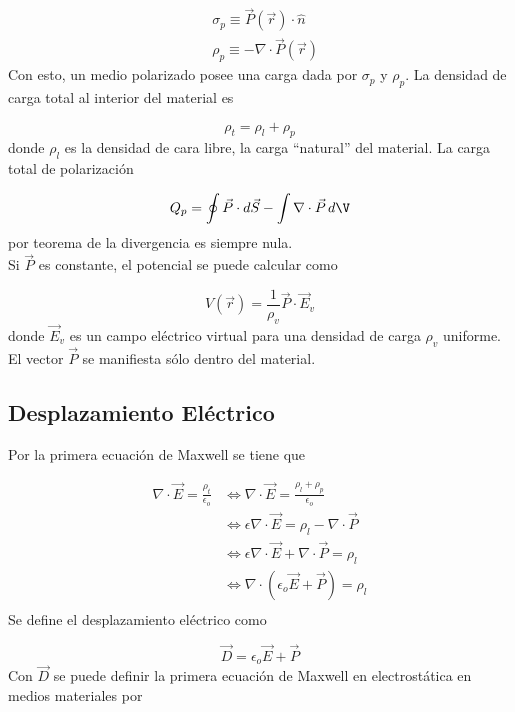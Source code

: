 \begin{equation}
\begin{split}
    &\sigma_p \equiv \Vec{P}(\Vec{r})\cdot\hat{n}\\
    &\rho_p \equiv -\nabla\cdot\Vec{P}(\Vec{r})
\end{split}
\nonumber
\end{equation}
\bigbreak
Con esto, un medio polarizado posee una carga dada por $\sigma_p$ y $\rho_p$. La densidad de carga total al interior del material es

\[\rho_t = \rho_l+\rho_p\]
\bigbreak
donde $\rho_l$ es la densidad de cara libre, la carga ``natural'' del material. La carga total de polarización

\[Q_p=\oint \Vec{P}\cdot d\Vec{S}-\int\nabla\cdot\Vec{P}\,d\V\]
\bigbreak
por teorema de la divergencia es siempre nula.\\

Si $\Vec{P}$ es constante, el potencial se puede calcular como

\[V(\Vec{r})=\frac{1}{\rho_v}\Vec{P}\cdot\Vec{E}_v\]
\bigbreak
donde $\Vec{E}_v$ es un campo eléctrico virtual para una densidad de carga $\rho_v$ uniforme. El vector $\Vec{P}$ se manifiesta sólo dentro del material.

\subsection{Desplazamiento Eléctrico}

Por la primera ecuación de Maxwell se tiene que

\begin{equation}
\begin{split}
    \nabla\cdot\Vec{E} = \frac{\rho_t}{\epsilon_o}
    & \Leftrightarrow \nabla\cdot\Vec{E} = \frac{\rho_l+\rho_p}{\epsilon_o}\\
    &\Leftrightarrow \epsilon\nabla\cdot\Vec{E}=\rho_l -
    \nabla\cdot\Vec{P}\\
    &\Leftrightarrow \epsilon\nabla\cdot\Vec{E}
    +\nabla\cdot\Vec{P}=\rho_l\\
    &\Leftrightarrow\nabla\cdot\left(\epsilon_o
    \Vec{E}+\Vec{P}\right) = \rho_l\\
\end{split}
\nonumber
\end{equation}
\bigbreak
Se define el desplazamiento eléctrico como

\[\Vec{D}=\epsilon_o\Vec{E}+\Vec{P}\]
\bigbreak
Con $\Vec{D}$ se puede definir la primera ecuación de Maxwell en electrostática en medios materiales por

